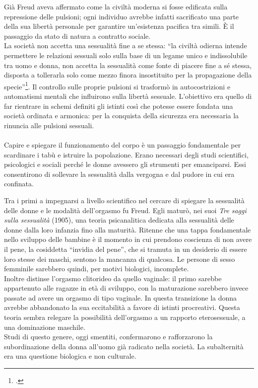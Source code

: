 Già Freud aveva affermato come la civiltà moderna si fosse edificata sulla repressione delle pulsioni; ogni individuo avrebbe infatti sacrificato una parte della sua libertà personale per garantire un'esistenza pacifica tra simili.
È il passaggio da stato di natura a contratto sociale.
\\La società non accetta una sessualità fine a se stessa: \enquote{la civiltà odierna intende permettere le relazioni sessuali solo sulla base di un legame unico e indissolubile tra uomo e donna, non accetta la sessualità come fonte di piacere fine a sé stessa, disposta a tollerarla solo come mezzo finora insostituito per la propagazione della specie}\footcite{Freud}.
Il controllo sulle proprie pulsioni si trasformò in autocostrizioni e automatismi mentali che influirono sulla libertà sessuale.
L'obiettivo era quello di far rientrare in schemi definiti gli istinti così che potesse essere fondata una società ordinata e armonica: per la conquista della sicurezza era necessaria la rinuncia alle pulsioni sessuali.

\paragraph{}Capire e spiegare il funzionamento del corpo è un passaggio fondamentale per scardinare i tabù e istruire la popolazione.
Erano necessari degli studi scientifici, psicologici e sociali perché le donne avessero gli strumenti per emanciparsi.
Essi consentirono di sollevare la sessualità dalla vergogna e dal pudore in cui era confinata.

Tra i primi a impegnarsi a livello scientifico nel cercare di spiegare la sessualità delle donne e le modalità dell'orgasmo fu Freud.
Egli maturò, nei suoi \textit{Tre saggi sulla sessualità} (1905), una teoria psicanalitica dedicata alla sessualità delle donne dalla loro infanzia fino alla maturità.
Ritenne che una tappa fondamentale nello sviluppo delle bambine è il momento in cui prendono coscienza di non avere il pene, la cosiddetta \enquote{invidia del pene}, che si tramuta in un desiderio di essere loro stesse dei maschi, sentono la mancanza di qualcosa.
Le persone di sesso femminile sarebbero quindi, per motivi biologici, incomplete.
\\Inoltre distinse l'orgasmo clitorideo da quello vaginale: il primo sarebbe appartenuto alle ragazze in età di sviluppo, con la maturazione sarebbero invece passate ad avere un orgasmo di tipo vaginale.
In questa transizione la donna avrebbe abbandonato la sua eccitabilità a favore di istinti procreativi.
Questa teoria sembra relegare la possibilità dell'orgasmo a un rapporto eterosessuale, a una dominazione maschile.
\\Studi di questo genere, oggi smentiti, confermarono e rafforzarono la subordinazione della donna all'uomo già radicato nella società.
La subalternità era una questione biologica e non culturale.

